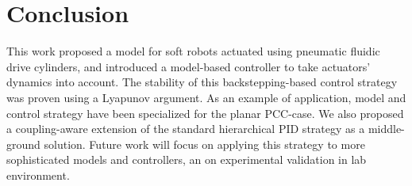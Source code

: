 \section{Conclusion}\label{sec:backstepping:conclusion}
%
This work proposed a model for soft robots actuated using pneumatic fluidic drive cylinders, and introduced a model-based controller to take actuators' dynamics into account. The stability of this backstepping-based control strategy was proven using a Lyapunov argument.  As an example of application, model and control strategy have been specialized for the planar \gls{PCC}-case. We also proposed a coupling-aware extension of the standard hierarchical PID strategy as a middle-ground solution. %
%
Future work will focus on applying this strategy to more sophisticated models and controllers, an on experimental validation in lab environment. %